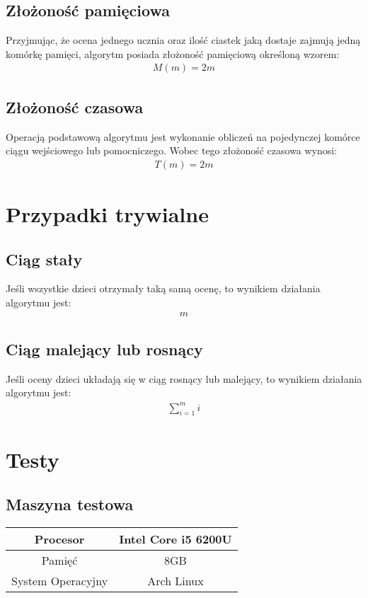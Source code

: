 \documentclass{article}
\begin{document}
	\subsection{Złożoność pamięciowa}
	Przyjmując, że ocena jednego ucznia oraz ilość ciastek jaką dostaje zajmują jedną komórkę pamięci, algorytm posiada złożoność pamięciową określoną wzorem:
	\begin{align*}
		M(m) = 2m
	\end{align*}

	\subsection{Złożoność czasowa}
	Operacją podstawową algorytmu jest wykonanie obliczeń na pojedynczej komórce ciągu wejściowego lub pomocniczego. Wobec tego złożoność czasowa wynosi:
	\begin{align*}
		T(m) = 2m
	\end{align*}


	\section{Przypadki trywialne}

	\subsection{Ciąg stały}

	Jeśli wszystkie dzieci otrzymały taką samą ocenę, to wynikiem działania algorytmu jest:
	\begin{align*}
		m
	\end{align*}

	\subsection{Ciąg malejący lub rosnący}

	Jeśli oceny dzieci układają się w ciąg rosnący lub malejący, to wynikiem działania algorytmu jest:
	\begin{align*}
		\displaystyle\sum_{i=1}^{m} i
	\end{align*}

	\section{Testy}

	\subsection{Maszyna testowa}
	\begin{center}
		\begin{longtable}{c c}
			\toprule
			Procesor & Intel Core i5 6200U \\
			\midrule
			Pamięć & 8GB \\
			\midrule
			System Operacyjny & Arch Linux\\
			\bottomrule
		\end{longtable}
	\end{center}
\end{document}
